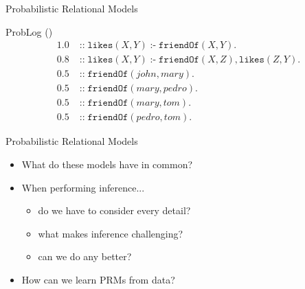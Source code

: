 \documentclass{beamer}
\DeclareMathOperator{\ifff}{:-}
\DeclareMathOperator{\prob}{::}
\begin{document}
\begin{frame}{Probabilistic Relational Models}
  \begin{block}{ProbLog (\cite{DBLP:conf/ijcai/RaedtKT07})}
    \vspace*{-\baselineskip}\setlength\belowdisplayshortskip{0pt}
    \begin{align*}
      1.0 &\prob \mathtt{likes}(X, Y) \ifff \mathtt{friendOf}(X, Y). \\
      0.8 &\prob \mathtt{likes}(X, Y) \ifff \mathtt{friendOf}(X, Z), \mathtt{likes}(Z, Y). \\
      0.5 &\prob \mathtt{friendOf}(\mathit{john}, \mathit{mary}). \\
      0.5 &\prob \mathtt{friendOf}(\mathit{mary}, \mathit{pedro}). \\
      0.5 &\prob \mathtt{friendOf}(\mathit{mary}, \mathit{tom}). \\
      0.5 &\prob \mathtt{friendOf}(\mathit{pedro}, \mathit{tom}).
    \end{align*}
  \end{block}
\end{frame}

\begin{frame}{Probabilistic Relational Models}
  \begin{itemize}
  \item What do these models have in common?
  \item When performing inference...
    \begin{itemize}
    \item do we have to consider every detail?
    \item what makes inference challenging?
    \item can we do any better?
    \end{itemize}
  \item How can we learn PRMs from data?
  \end{itemize}
\end{frame}
\end{document}
